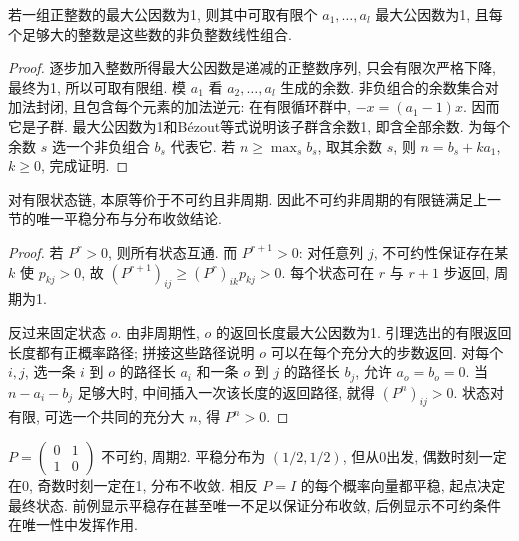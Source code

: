 \begin{lemma}[返回长度的整数工具]
若一组正整数的最大公因数为1, 则其中可取有限个 $a_1,\ldots,a_l$ 最大公因数为1, 且每个足够大的整数是这些数的非负整数线性组合.
\end{lemma}
\begin{proof}
逐步加入整数所得最大公因数是递减的正整数序列, 只会有限次严格下降, 最终为1, 所以可取有限组. 模 $a_1$ 看 $a_2,\ldots,a_l$ 生成的余数. 非负组合的余数集合对加法封闭, 且包含每个元素的加法逆元: 在有限循环群中, $-x=(a_1-1)x$. 因而它是子群. 最大公因数为1和B\'ezout等式说明该子群含余数1, 即含全部余数. 为每个余数 $s$ 选一个非负组合 $b_s$ 代表它. 若 $n\geq\max_s b_s$, 取其余数 $s$, 则 $n=b_s+ka_1$, $k\geq0$, 完成证明.
\end{proof}
\begin{theorem}
对有限状态链, 本原等价于不可约且非周期. 因此不可约非周期的有限链满足上一节的唯一平稳分布与分布收敛结论.
\end{theorem}
\begin{proof}
若 $P^r>0$, 则所有状态互通. 而 $P^{r+1}>0$: 对任意列 $j$, 不可约性保证存在某 $k$ 使 $p_{kj}>0$, 故 $(P^{r+1})_{ij}\geq(P^r)_{ik}p_{kj}>0$. 每个状态可在 $r$ 与 $r+1$ 步返回, 周期为1.

反过来固定状态 $o$. 由非周期性, $o$ 的返回长度最大公因数为1. 引理选出的有限返回长度都有正概率路径; 拼接这些路径说明 $o$ 可以在每个充分大的步数返回. 对每个 $i,j$, 选一条 $i$ 到 $o$ 的路径长 $a_i$ 和一条 $o$ 到 $j$ 的路径长 $b_j$, 允许 $a_o=b_o=0$. 当 $n-a_i-b_j$ 足够大时, 中间插入一次该长度的返回路径, 就得 $(P^n)_{ij}>0$. 状态对有限, 可选一个共同的充分大 $n$, 得 $P^n>0$.
\end{proof}
\begin{example}
$P=\begin{pmatrix}0&1\\1&0\end{pmatrix}$ 不可约, 周期2. 平稳分布为 $(1/2,1/2)$, 但从0出发, 偶数时刻一定在0, 奇数时刻一定在1, 分布不收敛. 相反 $P=I$ 的每个概率向量都平稳, 起点决定最终状态. 前例显示平稳存在甚至唯一不足以保证分布收敛, 后例显示不可约条件在唯一性中发挥作用.
\end{example}

